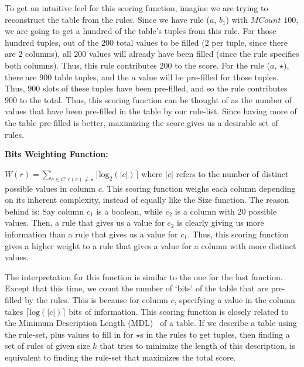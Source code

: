 \documentclass[10pt,journal,compsoc]{IEEEtran}
\newcommand{\stitle}[1]{\vspace{0.5em}\noindent\textbf{#1}}
\newcommand{\papertext}[1]{}
\newcommand{\techreporttext}[1]{#1}
\begin{document}
\techreporttext{To get an intuitive feel for this scoring function, imagine we are trying to reconstruct the table from the rules. Since we have rule ($a$, $b_1$) with $MCount$ $100$, we are going to get a hundred of the table's tuples from this rule. For those hundred tuples, out of the $200$ total values to be filled ($2$ per tuple, since there are $2$ columns), all $200$ values will already have been filled (since the rule specifies both columns). Thus, this rule contributes $200$ to the score. For the rule ($a$, $\star$), there are $900$ table tuples, and the $a$ value will be pre-filled for those tuples. Thus, $900$ slots of these tuples have been pre-filled, and so the rule contributes $900$ to the total. Thus, this scoring function can be thought of as the number of values that have been pre-filled in the table by our rule-list. Since having more of the table pre-filled is better, maximizing the score gives us a desirable set of rules.}

\stitle{Bits Weighting Function:}
\techreporttext{
$W(r) = \sum_{c \in C : r(c) \neq \star} \lceil \text{log}_2(|c|) \rceil$ where $|c|$ refers to the number of distinct possible values in column $c$. This scoring function weighs each column depending on its inherent complexity, instead of equally like the Size function. The reason behind is: Say column $c_1$ is a boolean, while $c_2$ is a column with $20$ possible values. Then, a rule that gives us a value for $c_2$ is clearly giving us more information than a rule that gives us a value for $c_1$. Thus, this scoring function gives a higher weight to a rule that gives a value for a column with more distinct values. 

The interpretation for this function is similar to the one for the last function. Except that this time, we count the number of `bits' of the table that are pre-filled by the rules. This is because for column $c$, specifying a value in the column takes $\lceil \text{log}(|c|)\rceil$ bits of information. This scoring function is closely related to the Minimum Description Length (MDL)~\cite{Grunwald:2007:MDL:1213810} of a table. If we describe a table using the rule-set, plus values to fill in for $\star$s in the rules to get tuples, then finding a set of rules of given size $k$ that tries to minimize the length of this description, is equivalent to finding the rule-set that maximizes the total score.}
\papertext{$W(r) = \sum_{c \in C : r(c) \neq \star} \lceil \text{log}_2(|c|) \rceil$ where $|c|$ refers to the number of distinct possible values in column $c$. This function weighs each column based on its inherent complexity, instead of equally like the Size function.}
\end{document}
